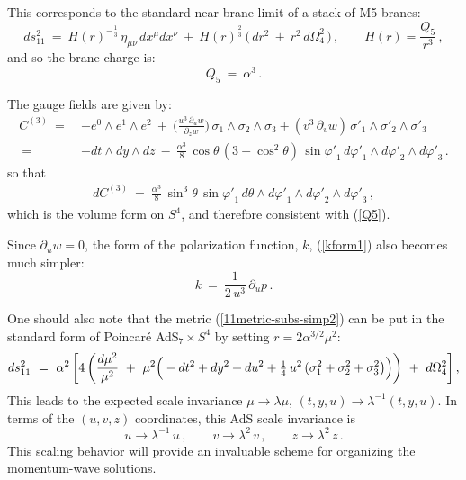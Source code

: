 \documentclass[11pt]{article}
\def\coeff#1#2{\relax{\textstyle \frac{#1}{#2}}\displaystyle}
\numberwithin{equation}{section}
\begin{document}
This corresponds to the standard near-brane limit of a stack of M5 branes:
%
\begin{equation}
ds_{11}^2   ~=~H( r)^{-\frac{1}{3}}  \, \eta_{\mu \nu}\, d x^\mu  dx^\nu ~+~ H( r)^{\frac{2}{3}}  \, \big( \, d r^2 ~+~ r^2  \, d \Omega_4^2 \, \big)     \,, \qquad H( r) = \frac{Q_5 }{ r^3} \,,
 \label{M5stack1}
\end{equation}
%
and so the brane charge is:
%
\begin{equation}
Q_5  ~=~ \alpha^3 \,.
 \label{Q5}
\end{equation}
%

The gauge fields are given by:
% 
\begin{equation}
\begin{aligned}
 C^{(3)} ~=~&  -  e^0 \wedge e^1 \wedge e^2 ~+~\bigg(\frac{u^3 \,\partial_u w}{\partial_z w}\bigg)\,  \sigma_1 \wedge \sigma_2  \wedge \sigma_3
 + (v^3 \,\partial_v w)\, {\sigma'}_1 \wedge {\sigma'}_2  \wedge {\sigma'}_3  \\
 ~=~&  -  dt \wedge dy \wedge dz  ~-~ \frac{\alpha^3}{8} \, \cos \theta \, (3 -\cos^2 \theta)\, \sin {\varphi'}_1 \, d{\varphi'}_1 \wedge d{\varphi'}_2  \wedge d{\varphi'}_3   \,. \label{C3simp1}
\end{aligned}
\end{equation}
%
so that 
% 
\begin{equation}
\begin{aligned}
 d C^{(3)} ~=~ \frac{\alpha^3}{8} \, \sin^3 \theta \, \sin {\varphi'}_1 \, d{\theta}\wedge d{\varphi'}_1 \wedge d{\varphi'}_2  \wedge d{\varphi'}_3   \,,
 \label{F4simp1}
\end{aligned}
\end{equation}
%
which is the volume form on $S^4$, and therefore consistent with  (\ref{Q5}).

Since $\partial_u w =0$, the form of the polarization function, $k$, (\ref{kform1}) also becomes much simpler: 
%
\begin{equation}
k ~=~\frac{1}{2\, u^3} \,  \partial_u p   \,.
 \label{kform2}
\end{equation}
%
  

One should also note that the metric (\ref{11metric-subs-simp2}) can be put in the standard form of Poincar\'e AdS$_7 \times S^4$ by setting $r =2 \alpha^{3/2} \mu^2$:
%
\begin{equation}
ds_{11}^2 ~=~ \alpha^2\, \bigg[ 4\, \bigg( \frac{d \mu^2}{\mu^2} ~+~ \mu^2 \Big( -dt^2 +  dy^2 + du^2  + \coeff{1}{4} \, u^2 \, (\sigma_1^2 +\sigma_2^2+ \sigma_3^2 \big) \Big) \bigg)\\
~+~   d\Omega_4^2 \bigg] \,,
 \label{11metric-AdS}
\end{equation}
%
This leads to the expected scale invariance $\mu \to \lambda  \mu$, $(t, y, u) \to \lambda^{-1} (t, y, u)$.  In terms of the $(u,v,z)$ coordinates, this AdS scale invariance is 
%
\begin{equation}
  u  \to \lambda^{-1}\, u \,, \qquad   v  \to \lambda^2 \, v \,, \qquad  z  \to \lambda^2 \, z   \,.
 \label{scaling1}
\end{equation}
%
This scaling behavior will provide an invaluable scheme for organizing the momentum-wave solutions.
\end{document}
